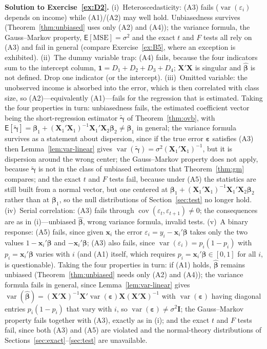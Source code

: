 \documentclass[12pt,a4paper]{article}
\theoremstyle{definition}
\newcommand\expc{\mathsf{E}}
\DeclareMathOperator\var{var}
\DeclareMathOperator\cov{cov}
\newcommand{\MSE}{\mathrm{MSE}}
\newcommand{\bX}{\mathbf{X}}
\newcommand{\bx}{\mathbf{x}}
\def\bb{\boldsymbol{\beta}}
\newcommand{\be}{\boldsymbol{\varepsilon}}
\newcommand{\bI}{\mathbf{I}}
\newcommand{\bone}{\mathbf{1}}
\begin{document}
\textbf{Solution to Exercise~\ref{ex:D2}.} (i)~Heteroscedasticity: (A3) fails ($\var(\varepsilon_i)$ depends on income) while (A1)/(A2) may well hold. Unbiasedness survives (Theorem~\ref{thm:unbiased} uses only (A2) and (A4)); the variance formula, the Gauss--Markov property, $\expc[\MSE] = \sigma^2$ and the exact $t$ and $F$ tests all rely on (A3) and fail in general (compare Exercise~\ref{ex:B5}, where an exception is exhibited). (ii)~The dummy variable trap: (A4) fails, because the four indicators sum to the intercept column, $\bone = D_1 + D_2 + D_3 + D_4$; $\bX'\bX$ is singular and $\hat{\bb}$ is not defined. Drop one indicator (or the intercept). (iii)~Omitted variable: the unobserved income is absorbed into the error, which is then correlated with class size, so (A2)---equivalently (A1)---fails for the regression that is estimated. Taking the four properties in turn: unbiasedness fails, the estimated coefficient vector being the short-regression estimator $\tilde{\boldsymbol\gamma}$ of Theorem~\ref{thm:ovb}, with $\expc[\tilde{\boldsymbol\gamma}] = \bb_1 + (\bX_1'\bX_1)^{-1}\bX_1'\bX_2\bb_2 \neq \bb_1$ in general; the variance formula survives as a statement about dispersion, since if the true error $\be$ satisfies (A3) then Lemma~\ref{lem:var-linear} gives $\var(\tilde{\boldsymbol\gamma}) = \sigma^2(\bX_1'\bX_1)^{-1}$, but it is dispersion around the wrong center; the Gauss--Markov property does not apply, because $\tilde{\boldsymbol\gamma}$ is not in the class of unbiased estimators that Theorem~\ref{thm:gm} compares; and the exact $t$ and $F$ tests fail, because under (A5) the statistics are still built from a normal vector, but one centered at $\bb_1 + (\bX_1'\bX_1)^{-1}\bX_1'\bX_2\bb_2$ rather than at $\bb_1$, so the null distributions of Section~\ref{sec:test} no longer hold. (iv)~Serial correlation: (A3) fails through $\cov(\varepsilon_t, \varepsilon_{t+1}) \neq 0$; the consequences are as in (i)---unbiased $\hat{\bb}$, wrong variance formula, invalid tests. (v)~A binary response: (A5) fails, since given $\bx_i$ the error $\varepsilon_i = y_i - \bx_i'\bb$ takes only the two values $1 - \bx_i'\bb$ and $-\bx_i'\bb$; (A3) also fails, since $\var(\varepsilon_i) = p_i(1 - p_i)$ with $p_i = \bx_i'\bb$ varies with $i$ (and (A1) itself, which requires $p_i = \bx_i'\bb \in [0,1]$ for all $i$, is questionable). Taking the four properties in turn: if (A1) holds, $\hat{\bb}$ remains unbiased (Theorem~\ref{thm:unbiased} needs only (A2) and (A4)); the variance formula fails in general, since Lemma~\ref{lem:var-linear} gives $\var(\hat{\bb}) = (\bX'\bX)^{-1}\bX'\var(\be)\bX(\bX'\bX)^{-1}$ with $\var(\be)$ having diagonal entries $p_i(1-p_i)$ that vary with $i$, so $\var(\be) \neq \sigma^2\bI$; the Gauss--Markov property fails together with (A3), exactly as in (i); and the exact $t$ and $F$ tests fail, since both (A3) and (A5) are violated and the normal-theory distributions of Sections~\ref{sec:exact}--\ref{sec:test} are unavailable.
\end{document}
